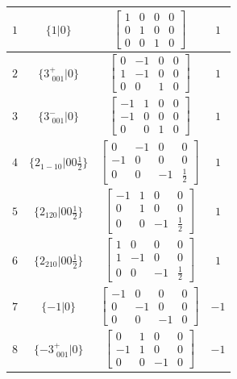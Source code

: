 \documentclass[fleqn,8pt]{jsarticle}
\begin{document}
\begin{longtable}{cccc}
$ 1 $ & $ \{1|0\} $ & $ \begin{bmatrix} 1 & 0 & 0 & 0 \\ 0 & 1 & 0 & 0 \\ 0 & 0 & 1 & 0 \end{bmatrix} $ & $ 1 $ \\ \hline
$ 2 $ & $ \{3^{+}_{\,\,001}|0\} $ & $ \begin{bmatrix} 0 & -1 & 0 & 0 \\ 1 & -1 & 0 & 0 \\ 0 & 0 & 1 & 0 \end{bmatrix} $ & $ 1 $ \\ \hline
$ 3 $ & $ \{3^{-}_{\,\,001}|0\} $ & $ \begin{bmatrix} -1 & 1 & 0 & 0 \\ -1 & 0 & 0 & 0 \\ 0 & 0 & 1 & 0 \end{bmatrix} $ & $ 1 $ \\ \hline
$ 4 $ & $ \{2{}_{1-10}|0 0 \frac{1}{2}\} $ & $ \begin{bmatrix} 0 & -1 & 0 & 0 \\ -1 & 0 & 0 & 0 \\ 0 & 0 & -1 & \frac{1}{2} \end{bmatrix} $ & $ 1 $ \\ \hline
$ 5 $ & $ \{2{}_{120}|0 0 \frac{1}{2}\} $ & $ \begin{bmatrix} -1 & 1 & 0 & 0 \\ 0 & 1 & 0 & 0 \\ 0 & 0 & -1 & \frac{1}{2} \end{bmatrix} $ & $ 1 $ \\ \hline
$ 6 $ & $ \{2{}_{210}|0 0 \frac{1}{2}\} $ & $ \begin{bmatrix} 1 & 0 & 0 & 0 \\ 1 & -1 & 0 & 0 \\ 0 & 0 & -1 & \frac{1}{2} \end{bmatrix} $ & $ 1 $ \\ \hline
$ 7 $ & $ \{-1|0\} $ & $ \begin{bmatrix} -1 & 0 & 0 & 0 \\ 0 & -1 & 0 & 0 \\ 0 & 0 & -1 & 0 \end{bmatrix} $ & $ -1 $ \\ \hline
$ 8 $ & $ \{-3^{+}_{\,\,001}|0\} $ & $ \begin{bmatrix} 0 & 1 & 0 & 0 \\ -1 & 1 & 0 & 0 \\ 0 & 0 & -1 & 0 \end{bmatrix} $ & $ -1 $ \\ \hline

\end{longtable}
\end{document}
